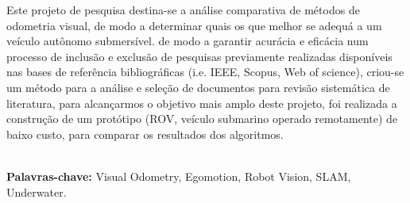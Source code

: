 \begin{thesisresumo}

Este projeto de pesquisa destina-se a análise comparativa de métodos de odometria visual, de modo a determinar quais os que melhor se adequá a um veículo autônomo submersível. de modo a garantir acurácia e eficácia num processo de inclusão e exclusão de pesquisas previamente realizadas disponíveis nas bases de referência bibliográficas (i.e. IEEE, Scopus, Web of science), criou-se um método para a análise e seleção de documentos para revisão sistemática de literatura, para alcançarmos o objetivo mais amplo deste projeto, foi realizada a construção de um protótipo (ROV, veículo submarino operado remotamente) de baixo custo, para comparar os resultados dos algoritmos.

\ \\
\textbf{Palavras-chave:} Visual Odometry, Egomotion, Robot Vision, SLAM, Underwater.
\ \\

\end{thesisresumo}
